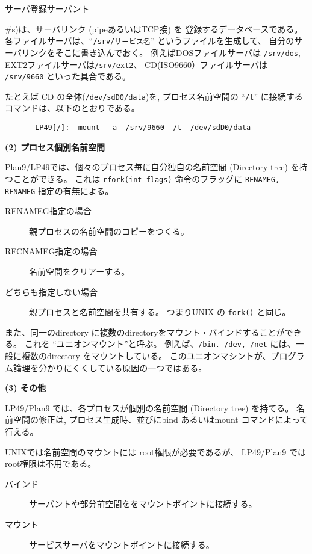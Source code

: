 サーバ登録サーバント{\#s)は、サーバリンク (pipeあるいはTCP接) を
登録するデータベースである。
各ファイルサーバは、``{\tt /srv/サービス名}'' というファイルを生成して、
自分のサーバリンクをそこに書き込んでおく。
例えばDOSファイルサーバは {\tt /srv/dos}, EXT2ファイルサーバは{\tt /srv/ext2}、
CD(ISO9660）ファイルサーバは {\tt /srv/9660}
といった具合である。

たとえば CD の全体({\tt /dev/sdD0/data})を, プロセス名前空間の ``{\tt /t}''
に接続するコマンドは、以下のとおりである。
\begin{verbatim}
       LP49[/]:  mount  -a  /srv/9660  /t  /dev/sdD0/data
\end{verbatim}


{\bf\flushleft (2) プロセス個別名前空間}

  Plan9/LP49では、個々のプロセス毎に自分独自の名前空間 (Directory tree)
  を持つことができる。
  これは \verb|rfork(int flags)| 命令のフラッグに {\tt RFNAMEG, RFNAMEG}
  指定の有無による。
  \begin{description}
    \item[RFNAMEG指定の場合]  親プロセスの名前空間のコピーをつくる。
    \item[RFCNAMEG指定の場合] 名前空間をクリアーする。
    \item[どちらも指定しない場合] 親プロセスと名前空間を共有する。
             つまりUNIX の {\tt fork()} と同じ。
   \end{description}

  また、同一のdirectory に複数のdirectoryをマウント・バインドすることができる。
  これを ``ユニオンマウント''と呼ぶ。
  例えば、{\tt /bin. /dev, /net} には、一般に複数のdirectory をマウントしている。
  このユニオンマシントが、プログラム論理を分かりにくくしている原因の一つではある。



{\bf\flushleft (3) その他}

   LP49/Plan9 では、各プロセスが個別の名前空間 (Directory tree) を持てる。
   名前空間の修正は, プロセス生成時、並びにbind あるいはmount コマンドによって行える。
 
  UNIXでは名前空間のマウントには root権限が必要であるが、
  LP49/Plan9 ではroot権限は不用である。

\begin{description}
\item[バインド]  サーバントや部分前空間ををマウントポイントに接続する。
\item[マウント]  サービスサーバをマウントポイントに接続する。
\end{description}

}
